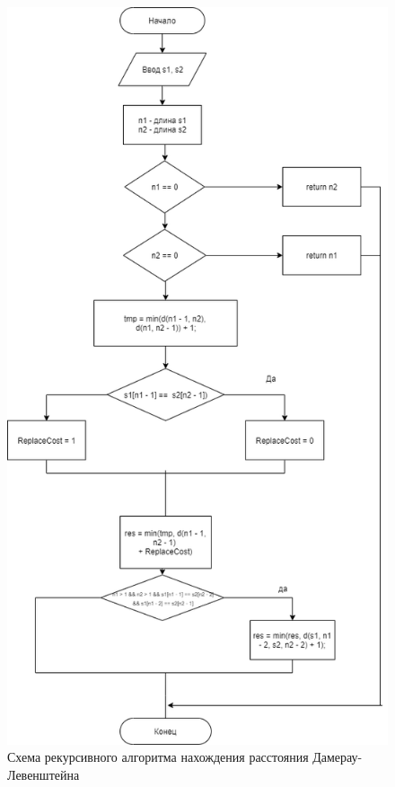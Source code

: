 \documentclass[12pt]{report}
\begin{document}
\begin{figure}[h]
\centering
\includegraphics[width=0.75\linewidth]{RecDL.png}
\caption{Схема рекурсивного алгоритма нахождения расстояния Дамерау-Левенштейна}
\label{fig:mpr}
\end{figure}
\end{document}
